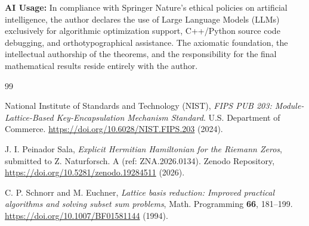 \documentclass[sn-mathphys, a4paper]{sn-jnl}
\begin{document}
\textbf{AI Usage:} In compliance with Springer Nature's ethical policies on artificial intelligence, the author declares the use of Large Language Models (LLMs) exclusively for algorithmic optimization support, C++/Python source code debugging, and orthotypographical assistance. The axiomatic foundation, the intellectual authorship of the theorems, and the responsibility for the final mathematical results reside entirely with the author.

\begin{thebibliography}{99}

National Institute of Standards and Technology (NIST), \textit{FIPS PUB 203: Module-Lattice-Based Key-Encapsulation Mechanism Standard}. U.S. Department of Commerce. \url{https://doi.org/10.6028/NIST.FIPS.203} (2024).

J. I. Peinador Sala, \textit{Explicit Hermitian Hamiltonian for the Riemann Zeros}, submitted to Z. Naturforsch. A (ref: ZNA.2026.0134). Zenodo Repository, \url{https://doi.org/10.5281/zenodo.19284511} (2026).

C. P. Schnorr and M. Euchner, \textit{Lattice basis reduction: Improved practical algorithms and solving subset sum problems}, Math. Programming \textbf{66}, 181--199. \url{https://doi.org/10.1007/BF01581144} (1994).

\end{thebibliography}
\end{document}
